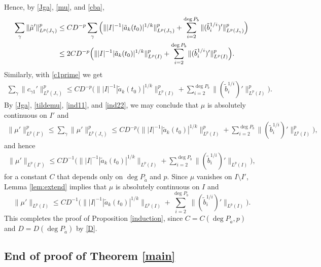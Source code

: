 \documentclass[12pt]{amsart}
\theoremstyle{plain}
\theoremstyle{definition}
\numberwithin{equation}{section}
\begin{document}
Hence, by \eqref{Jga}, \eqref{mu}, and  \eqref{cba},
\begin{align} \label{ind11}
  \sum_{\gamma} \|\tilde \mu'\|^p_{L^p(J_{\gamma})} 
  &\le C D^{-p}  \sum_{\gamma} \Big( \| |I|^{-1}  {|\tilde a_k(t_0)|^{1/k}} \|^p_{L^p (J_{\gamma})} 
  + \sum_{i=2}^{\deg P_b} \|(\tilde b_i^{1/i})'\|^p_{L^p (J_{\gamma})}\Big)
  \notag \\
  &\le 2 C D^{-p}  \Big( \| |I|^{-1}  {|\tilde a_k(t_0)|^{1/k}} \|^p_{L^p (I)} 
  + \sum_{i=2}^{\deg P_b} \|(\tilde b_i^{1/i})'\|^p_{L^p (I)}\Big). 
\end{align}
Similarly, with \eqref{c1prime} we get
\begin{align} \label{ind22}
  \sum_{\gamma} \|c_{{\gamma} 1}'\|^p_{L^p(J_{\gamma})} 
  \le C D^{-p}  \Big( \| |I|^{-1}  {|\tilde a_k(t_0)|^{1/k}} \|^p_{L^p (I)} 
  + \sum_{i=2}^{\deg P_b} \|(\tilde b_i^{1/i})'\|^p_{L^p (I)}\Big). 
\end{align}
By \eqref{Jga}, \eqref{tildemu}, \eqref{ind11}, and \eqref{ind22}, we may conclude that $\mu$ is absolutely continuous on $I'$ and 
\begin{align*}
  \|\mu'\|^p_{L^p(I')} \le \sum_{\gamma} \|\mu'\|^p_{L^p(J_{\gamma})} 
  \le C D^{-p}  \Big( \| |I|^{-1}  {|\tilde a_k(t_0)|^{1/k}} \|^p_{L^p (I)} 
  + \sum_{i=2}^{\deg P_b} \|(\tilde b_i^{1/i})'\|^p_{L^p (I)}\Big), 
\end{align*}
and hence
\begin{align*}
  \|\mu'\|_{L^p(I')} 
  \le C D^{-1}  \Big( \| |I|^{-1}  {|\tilde a_k(t_0)|^{1/k}} \|_{L^p (I)} 
  + \sum_{i=2}^{\deg P_b} \|(\tilde b_i^{1/i})'\|_{L^p (I)}\Big),
\end{align*}
for a constant $C$ that depends only on $\deg P_{\tilde a}$ and $p$.
Since $\mu$ vanishes on $I \setminus I'$, Lemma \ref{lem:extend} implies that $\mu$ is absolutely continuous on $I$ and  
\begin{equation*} 
  \|\mu'\|_{L^p(I)} \le C D^{-1}  \Big( \| |I|^{-1}  {|\tilde a_k(t_0)|^{1/k}} \|_{L^p (I)} 
  + \sum_{i=2}^{\deg P_b} \|(\tilde b_i^{1/i})'\|_{L^p (I)}\Big).
\end{equation*}
This completes the proof of Proposition \ref{induction}, since $C = C(\deg P_{\tilde a},p)$ 
and $D = D(\deg P_{\tilde a})$ by \eqref{D}.

\subsection{End of proof of Theorem \ref{main}} \label{end}
\end{document}
